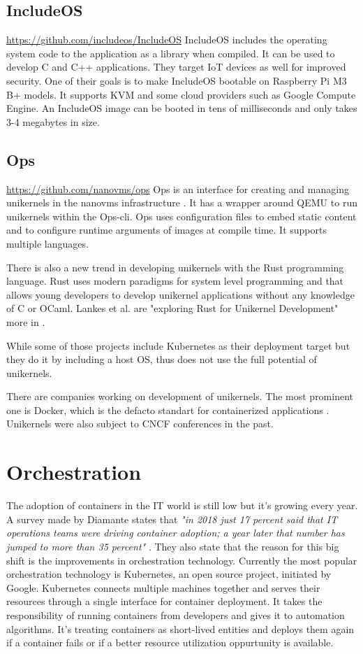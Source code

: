 \subsection*{IncludeOS}
\url{https://github.com/includeos/IncludeOS} \cite{7396164}
IncludeOS includes the operating system code to the application as a library when compiled. It can be used to develop C and C++ applications. They target IoT devices as well for improved security. One of their goals is to make IncludeOS bootable on Raspberry Pi M3 B+ models. It supports KVM and some cloud providers such as Google Compute Engine. An IncludeOS image can be booted in tens of milliseconds and only takes 3-4 megabytes in size.

\subsection*{Ops}
\url{https://github.com/nanovms/ops}
  Ops is an interface for creating and managing unikernels in the nanovms infrastructure \cite{nanovms}. It has a wrapper around QEMU \cite{qemu} to run unikernels within the Ops-cli. Ops uses configuration files to embed static content and to configure runtime arguments of images at compile time. It supports multiple languages.
\newline


There is also a new trend in developing unikernels with the Rust programming language. Rust uses modern paradigms for system level programming and that allows young developers to develop unikernel applications without any knowledge of C or OCaml. Lankes et al. are "exploring Rust for Unikernel Development" more in \cite{Lankes2019}.

While some of those projects include Kubernetes as their deployment target but they do it by including a host OS, thus does not use the full potential of unikernels.

There are companies working on development of unikernels. The most prominent one is Docker, which is the defacto standart for containerized applications \cite{francia_2016}. Unikernels were also subject to CNCF conferences in the past.

\section{Orchestration}
The adoption of containers in the IT world is still low but it's growing every year. A survey made by Diamante states that \textit{"in 2018 just 17 percent said that IT operations teams were driving container adoption; a year later that number has jumped to more than 35 percent"} \cite{diamante}. They also state that the reason for this big shift is the improvements in orchestration technology. Currently the most popular orchestration technology is Kubernetes, an open source project, initiated by Google. Kubernetes connects multiple machines together and serves their resources through a single interface for container deployment. It takes the responsibility of running containers from developers and gives it to automation algorithms. It's treating containers as short-lived entities and deploys them again if a container fails or if a better resource utilization oppurtunity is available.

